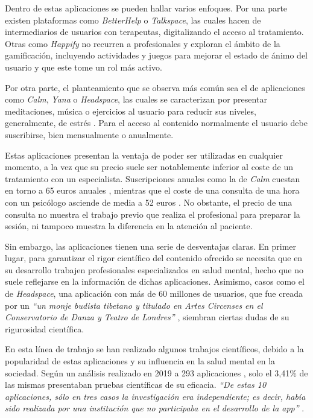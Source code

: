         Dentro de estas aplicaciones se pueden hallar varios enfoques. Por una parte existen plataformas como \textit{BetterHelp} o \textit{Talkspace}, las cuales hacen de intermediarios de usuarios con terapeutas, digitalizando el acceso al tratamiento. Otras como \textit{Happify} no recurren a profesionales y exploran el ámbito de la gamificación, incluyendo actividades y juegos para mejorar el estado de ánimo del usuario y que este tome un rol más activo. 
        
        Por otra parte, el planteamiento que se observa más común sea el de aplicaciones como \textit{Calm}, \textit{Yana} o \textit{Headspace}, las cuales se caracterizan por presentar meditaciones, música o ejercicios al usuario para reducir sus niveles, generalmente, de estrés \cite{modglin_5_2023} \cite{pepinosa_cinco_2023}. Para el acceso al contenido normalmente el usuario debe suscribirse, bien mensualmente o anualmente. 

        Estas aplicaciones presentan la ventaja de poder ser utilizadas en cualquier momento, a la vez que su precio suele ser notablemente inferior al coste de un tratamiento con un especialista. Suscripciones anuales como la de \textit{Calm} cuestan en torno a 65 euros anuales \cite{modglin_5_2023}, mientras que el coste de una consulta de una hora con un psicólogo asciende de media a 52 euros \cite{garcia_santos_boom_2023}. No obstante, el precio de una consulta no muestra el trabajo previo que realiza el profesional para preparar la sesión, ni tampoco muestra la diferencia en la atención al paciente.

        Sin embargo, las aplicaciones tienen una serie de desventajas claras. En primer lugar, para garantizar el rigor científico del contenido ofrecido se necesita que en su desarrollo trabajen profesionales especializados en salud mental, hecho que no suele reflejarse en la información de dichas aplicaciones. Asimismo, casos como el de \textit{Headspace}, una aplicación con más de 60 millones de usuarios, que fue creada por un \textit{``un monje budista tibetano y titulado en Artes Circenses en el Conservatorio de Danza y Teatro de Londres''} \cite{garcia_santos_boom_2023}, siembran ciertas dudas de su rigurosidad científica.
        
        En esta línea de trabajo se han realizado algunos trabajos científicos, debido a la popularidad de estas aplicaciones y su influencia en la salud mental en la sociedad. Según un análisis realizado en 2019 a 293 aplicaciones \cite{marshall_digital_2019}, solo el 3,41\% de las mismas presentaban pruebas científicas de su eficacia. \textit{``De estas 10 aplicaciones, sólo en tres casos la investigación era independiente; es decir, había sido realizada por una institución que no participaba en el desarrollo de la app''} \cite{garcia_santos_boom_2023}.

